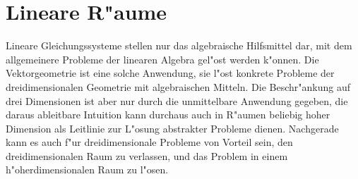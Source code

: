 %
%
%
\chapter{Lineare R"aume\label{chapter-vr}}
Lineare Gleichungssysteme stellen nur das algebraische Hilfsmittel dar,
mit dem allgemeinere Probleme der linearen Algebra gel"ost werden 
k"onnen.
Die Vektorgeometrie ist eine solche Anwendung, sie l"ost konkrete 
Probleme der dreidimensionalen Geometrie mit algebraischen Mitteln.
Die Beschr"ankung auf drei Dimensionen ist aber nur durch die unmittelbare
Anwendung gegeben, die daraus ableitbare Intuition kann durchaus 
auch in R"aumen beliebig hoher Dimension als Leitlinie zur L"osung
abstrakter Probleme dienen.
Nachgerade kann es auch f"ur dreidimensionale
Probleme von Vorteil sein, den dreidimensionalen Raum zu verlassen,
und das Problem in einem h"oherdimensionalen Raum zu l"osen.

